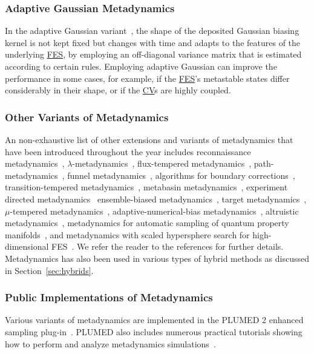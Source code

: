 \documentclass[9pt,review]{livecoms}
\begin{document}
\subsubsection{Adaptive Gaussian Metadynamics}
In the adaptive Gaussian variant~\cite{Branduardi-JCTC-2012}, the shape of the deposited Gaussian biasing kernel is not kept fixed but changes with time and adapts to the features of the underlying \hyperlink{ref:FES} {FES}, by employing an off-diagonal variance matrix that is estimated according to certain rules. Employing adaptive Gaussian can improve the performance in some cases, for example, if the \hyperlink{ref:FES} {FES}'s metastable states differ considerably in their shape, or if the \hyperlink{ref:CV} {CV}s are highly coupled.

\subsubsection{Other Variants of Metadynamics}
\label{sec:metad_variants}
An non-exhaustive list of other extensions and variants of metadynamics that have been introduced throughout the year includes
reconnaissance metadynamics~\cite{10.1073/pnas.1011511107},
$\lambda$-metadynamics~\cite{10.1021/jz200808x},
flux-tempered metadynamics~\cite{Singh-JStatPhys-2011,Singh-JCTC-2012},
path-metadynamics~\cite{10.1103/physrevlett.109.020601,10.1063/1.5027392},
funnel metadynamics~\cite{10.1073/pnas.1303186110,10.1038/s41596-020-0342-4},
algorithms for boundary corrections~\cite{McGovern-JCP-2013},
transition-tempered metadynamics~\cite{Dama-JCTC-2014}, metabasin metadynamics~\cite{10.1021/acs.jctc.5b00907},
experiment directed metadynamics~\cite{White_EDM_2015}
ensemble-biased metadynamics~\cite{Marinelli_EnsembleBiased_2015},
target metadynamics~\cite{GilLey_TargetMetaD_2016},
$\mu$-tempered metadynamics~\cite{10.1063/1.4937939},
adaptive-numerical-bias metadynamics~\cite{10.1002/jcc.25066},
altruistic metadynamics~\cite{10.1021/acs.jpcb.6b00087,10.1063/1.4978939},
metadynamics for automatic sampling of quantum property manifolds~\cite{Lindner_ASQPM-MetaD_2019},
and
metadynamics with scaled hypersphere search for high-dimensional FES~\cite{Mitsuta_SHS-MetaD_JCTC2020}.
We refer the reader to the references for further details. Metadynamics has also been used in various types of hybrid methods as discussed in Section~\ref{sec:hybrids}.

\subsubsection{Public Implementations of Metadynamics}
Various variants of metadynamics are implemented in the PLUMED 2 enhanced sampling plug-in~\cite{Bonomi-CPC-2009,Tribello2014,plumed-nest}. PLUMED also includes numerous practical tutorials showing how to perform and analyze metadynamics simulations~\cite{plumed_masterclass}.
\end{document}
